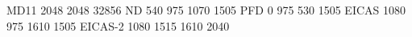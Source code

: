 MD11 2048 2048 32856
ND       540  975 1070 1505
PFD        0  975  530 1505
EICAS   1080  975 1610 1505
EICAS-2 1080 1515 1610 2040
